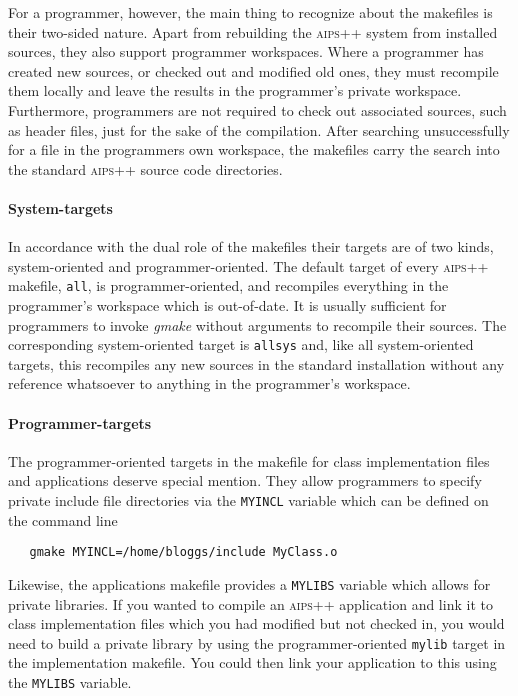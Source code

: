 For a programmer, however, the main thing to recognize about the makefiles is
their two-sided nature.  Apart from rebuilding the \textsc{aips++} system from
installed sources, they also support programmer workspaces.  Where a
programmer has created new sources, or checked out and modified old ones, they
must recompile them locally and leave the results in the programmer's private
workspace.  Furthermore, programmers are not required to check out associated
sources, such as header files, just for the sake of the compilation.  After
searching unsuccessfully for a file in the programmers own workspace, the
makefiles carry the search into the standard \textsc{aips++} source code
directories.

\paragraph{System-targets}
In accordance with the dual role of the makefiles their targets are of two
kinds, system-oriented and programmer-oriented.  The default target of every
\textsc{aips++} makefile, \texttt{all}, is programmer-oriented, and recompiles
everything in the programmer's workspace which is out-of-date.  It is usually
sufficient for programmers to invoke \textit{gmake} without arguments to recompile
their sources.  The corresponding system-oriented target is \texttt{allsys} and,
like all system-oriented targets, this recompiles any new sources in the
standard installation without any reference whatsoever to anything in the
programmer's workspace.

\paragraph{Programmer-targets}
The programmer-oriented targets in the makefile for class implementation files
and applications deserve special mention.  They allow programmers to specify
private include file directories via the \texttt{MYINCL} variable which can be
defined on the command line

\begin{verbatim}
   gmake MYINCL=/home/bloggs/include MyClass.o
\end{verbatim}

\noindent
Likewise, the applications makefile provides a \texttt{MYLIBS} variable which
allows for private libraries.  If you wanted to compile an \textsc{aips++}
application and link it to class implementation files which you had modified
but not checked in, you would need to build a private library by using the
programmer-oriented \texttt{mylib} target in the implementation makefile.  You
could then link your application to this using the \texttt{MYLIBS} variable.

